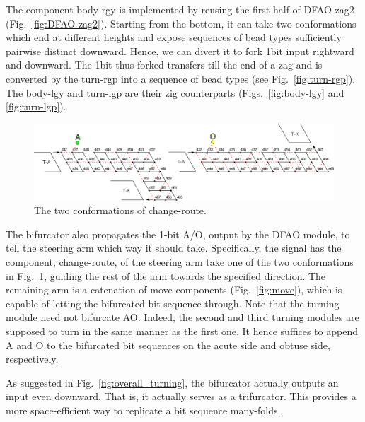The component body-rgy is implemented by reusing the first half of DFAO-zag2 (Fig.~\ref{fig:DFAO-zag2}). 
Starting from the bottom, it can take two conformations which end at different heights and expose sequences of bead types sufficiently pairwise distinct downward. 
Hence, we can divert it to fork 1bit input rightward and downward. 
The 1bit thus forked transfers till the end of a zag and is converted by the turn-rgp into a sequence of bead types (see Fig.~\ref{fig:turn-rgp}). 
The body-lgy and turn-lgp are their zig counterparts (Figs.~\ref{fig:body-lgy} and \ref{fig:turn-lgp}). 


\begin{figure}[h]
\centering
\includegraphics[width=0.9\linewidth]{pic/change-route.png}
\caption{The two conformations of change-route.}
\label{fig:change_route}
\end{figure}

The bifurcator also propagates the 1-bit A/O, output by the DFAO module, to tell the steering arm which way it should take.
Specifically, the signal has the component, change-route, of the steering arm take one of the two conformations in Fig.~\ref{fig:change_route}, guiding the rest of the arm towards the specified direction.
The remaining arm is a catenation of move components (Fig.~\ref{fig:move}), which is capable of letting the bifurcated bit sequence through.  
Note that the turning module need not bifurcate AO.
Indeed, the second and third turning modules are supposed to turn in the same manner as the first one.
It hence suffices to append A and O to the bifurcated bit sequences on the acute side and obtuse side, respectively. %

\begin{remark}
As suggested in Fig.~\ref{fig:overall_turning}, the bifurcator actually outputs an input even downward.
That is, it actually serves as a trifurcator.
This provides a more space-efficient way to replicate a bit sequence many-folds.
\end{remark}

